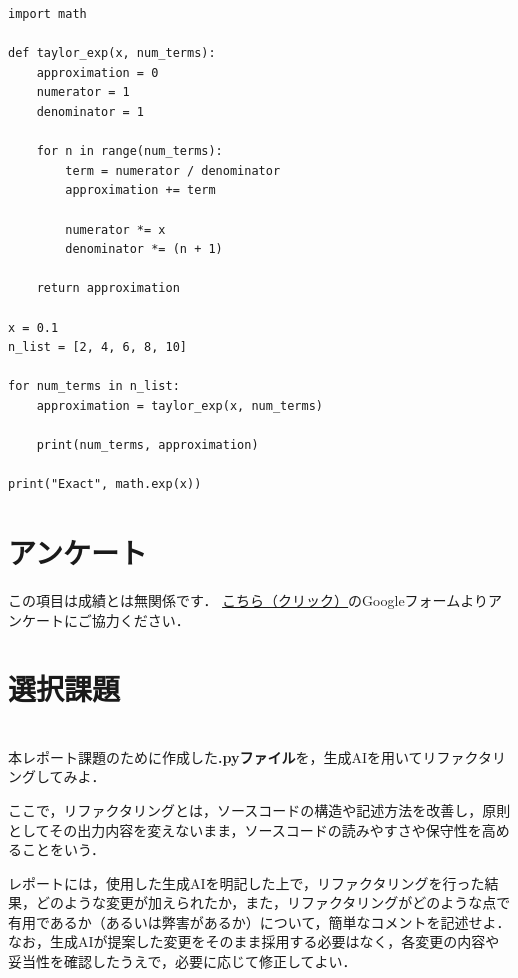 \documentclass[a4paper,12pt]{jsarticle}
\begin{document}
\begin{lstlisting}[caption=指数関数の場合,label=src_exp]
import math

def taylor_exp(x, num_terms):
    approximation = 0
    numerator = 1
    denominator = 1

    for n in range(num_terms):
        term = numerator / denominator
        approximation += term

        numerator *= x
        denominator *= (n + 1)

    return approximation

x = 0.1
n_list = [2, 4, 6, 8, 10]

for num_terms in n_list:
    approximation = taylor_exp(x, num_terms)

    print(num_terms, approximation)

print("Exact", math.exp(x))
\end{lstlisting}


\section*{アンケート}

この項目は成績とは無関係です．
\href{https://forms.gle/YCL48AfDZnM4A4eXA}{こちら（クリック）}のGoogleフォームよりアンケートにご協力ください．

\clearpage

\appendix
\renewcommand{\thesection}{\Alph{section}}

\section*{選択課題}

\section{}
\label{sec:ai_assist}

本レポート課題のために作成した{\bf .pyファイル}を，生成AIを用いてリファクタリングしてみよ．

ここで，リファクタリングとは，ソースコードの構造や記述方法を改善し，原則としてその出力内容を変えないまま，ソースコードの読みやすさや保守性を高めることをいう．

レポートには，使用した生成AIを明記した上で，リファクタリングを行った結果，どのような変更が加えられたか，また，リファクタリングがどのような点で有用であるか（あるいは弊害があるか）について，簡単なコメントを記述せよ．なお，生成AIが提案した変更をそのまま採用する必要はなく，各変更の内容や妥当性を確認したうえで，必要に応じて修正してよい．
\end{document}
